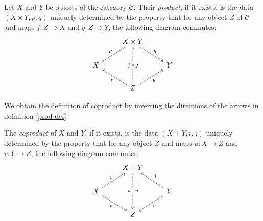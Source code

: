 \documentclass{amsart}
\begin{document}
\begin{defn}\label{prod-def}
	Let $X$ and $Y$ be objects of the category $\mathcal{C}$. Their
	\emph{product}, if it exists, is the data $(X \times Y, p, q)$
	uniquely determined by the property that for any object $Z$ of
	$\mathcal{C}$ and maps $f : Z \to X$ and $g : Z \to Y$, the
	following diagram commutes:
	\begin{equation}\label{prod-cd}
		\begin{tikzcd}
			& X \times Y \arrow[ld, "p"'] \arrow[rd, "q"] & \\
			  X &            & Y \\
			  & Z \arrow[lu, "f"] \arrow[ru, "g"']
			      \arrow[uu, dashed, "f \times g" description] & 
		\end{tikzcd}
	\end{equation}
\end{defn}

We obtain the definition of coproduct by inverting the directions of the
arrows in definition \ref{prod-def}:

\begin{defn}\label{coprod-def}
	The \emph{coproduct} of $X$ and $Y$, if it exists, is the data
	$(X + Y, i, j)$ uniquely determined by the property that for any
	object $Z$ and maps $u : X \to Z$ and $v : Y \to Z$, the following
	diagram commutes:
	\begin{equation}\label{coprod-cd}
		\begin{tikzcd}
			& X + Y \arrow[dd, dashed, "u + v" description] &
					\\
			X \arrow[rd, "u"'] \arrow[ru, "i"] & & Y
				\arrow[ld, "v"] \arrow[lu, "j"'] \\
			& Z &
		\end{tikzcd}
	\end{equation}
\end{defn}



\end{document}
